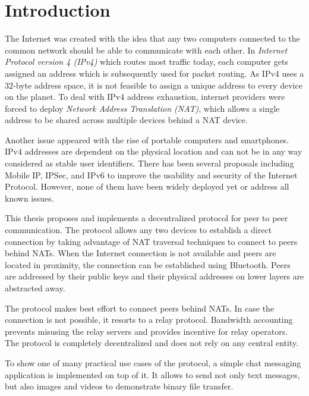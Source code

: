 \chapter{Introduction}

The Internet was created with the idea that any two computers connected to the common network should be able to communicate with each other. In \textit{Internet Protocol version 4 (IPv4)} which routes most traffic today, each computer gets assigned an address which is subsequently used for packet routing. As IPv4 uses a 32-byte address space, it is not feasible to assign a unique address to every device on the planet. To deal with IPv4 address exhaustion, internet providers were forced to deploy \textit{Network Address Translation (NAT)}, which allows a single address to be shared across multiple devices behind a NAT device.

Another issue appeared with the rise of portable computers and smartphones. IPv4 addresses are dependent on the physical location and can not be in any way considered as stable user identifiers. There has been several proposals including Mobile IP, IPSec, and IPv6 to improve the usability and security of the Internet Protocol. However, none of them have been widely deployed yet or address all known issues.

This thesis proposes and implements a decentralized protocol for peer to peer communication. The protocol allows any two devices to establish a direct connection by taking advantage of NAT traversal techniques to connect to peers behind NATs. When the Internet connection is not available and peers are located in proximity, the connection can be established using Bluetooth. Peers are addressed by their public keys and their physical addresses on lower layers are abstracted away.

The protocol makes best effort to connect peers behind NATs. In case the connection is not possible, it resorts to a relay protocol. Bandwidth accounting prevents misusing the relay servers and provides incentive for relay operators. The protocol is completely decentralized and does not rely on any central entity.


To show one of many practical use cases of the protocol, a simple chat messaging application is implemented on top of it. It allows to send not only text messages, but also images and videos to demonstrate binary file transfer.

